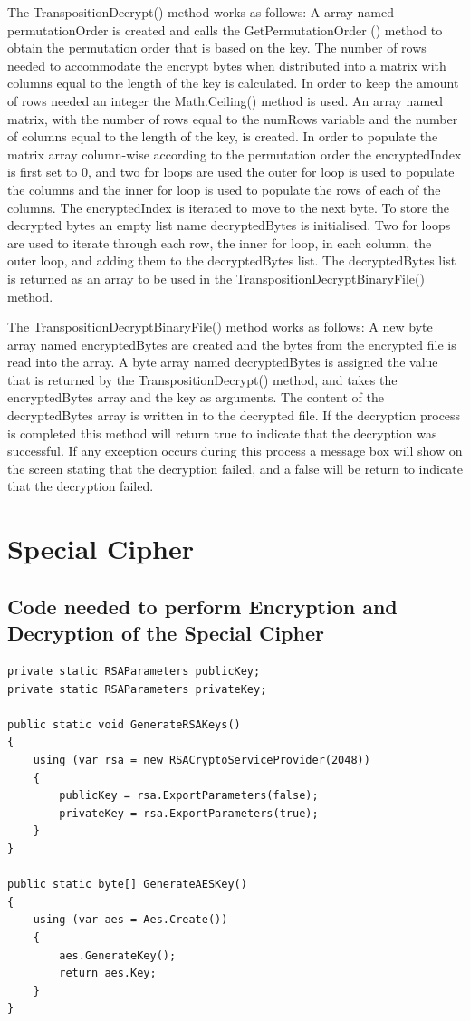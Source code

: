 \documentclass[a4paper,oneside,11pt]{book}
\begin{document}
The TranspositionDecrypt() method works as follows:
A array named permutationOrder is created and calls the GetPermutationOrder () method to obtain the permutation order that is based on the key. The number of rows needed to accommodate the encrypt bytes when distributed into a matrix with columns equal to the length of the key is calculated. In order to keep the amount of rows needed an integer the Math.Ceiling() method is used. An array named matrix, with the number of rows equal to the numRows variable and the number of columns equal to the length of the key, is created. In order to populate the matrix array column-wise according to the permutation order the encryptedIndex is first set to 0, and two for loops are used the outer for loop is used to populate the columns and the inner for loop is used to populate the rows of each of the columns. The encryptedIndex is iterated to move to the next byte. To store the decrypted bytes an empty list name decryptedBytes is initialised. Two for loops are used to iterate through each row, the inner for loop, in each column, the outer loop, and adding them to the decryptedBytes list. The decryptedBytes list is returned as an array to be used in the TranspositionDecryptBinaryFile() method.

The TranspositionDecryptBinaryFile() method works as follows:
A new byte array named encryptedBytes are created and the bytes from the encrypted file is read into the array. A byte array named decryptedBytes is assigned the value that is returned by the TranspositionDecrypt() method, and takes the encryptedBytes array and the key as arguments. The content of the decryptedBytes array is written in to the decrypted file. If the decryption process is completed this method will return true to indicate that the decryption was successful. If any exception occurs during this process a message box will show on the screen stating that the decryption failed, and a false will be return to indicate that the decryption failed.

\chapter[Special Cipher]{Special Cipher}

\section{Code needed to perform Encryption and Decryption of the Special Cipher}
\begin{lstlisting}[language=Csh, caption={Code for Special Cipher}]
private static RSAParameters publicKey;
private static RSAParameters privateKey;

public static void GenerateRSAKeys()
{
    using (var rsa = new RSACryptoServiceProvider(2048))
    {
        publicKey = rsa.ExportParameters(false);
        privateKey = rsa.ExportParameters(true); 
    }
}

public static byte[] GenerateAESKey()
{
    using (var aes = Aes.Create())
    {
        aes.GenerateKey();
        return aes.Key;
    }
}
\end{lstlisting}
\end{document}

